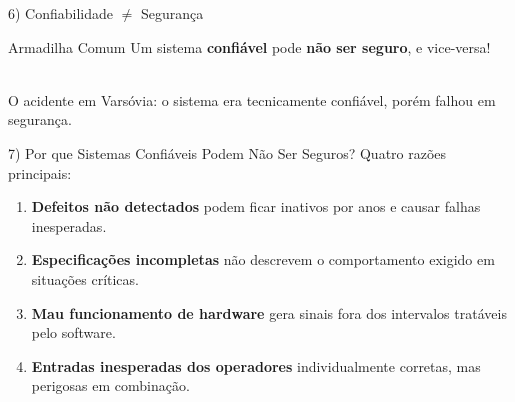 \documentclass[aspectratio=169]{beamer}
\begin{document}
\begin{frame}{6) Confiabilidade $\neq$ Segurança}
  \begin{alertblock}{Armadilha Comum}
    Um sistema \textbf{confiável} pode \textbf{não ser seguro}, e vice-versa!
  \end{alertblock}

  \vspace{0.5em}
  \centering
  \vspace{0.3em}\\
  \small{O acidente em Varsóvia: o sistema era tecnicamente confiável, porém falhou em segurança.}
\end{frame}

\begin{frame}{7) Por que Sistemas Confiáveis Podem Não Ser Seguros?}
  Quatro razões principais:
  \begin{enumerate}
    \item \textbf{Defeitos não detectados} podem ficar inativos por anos e causar falhas inesperadas.
    \item \textbf{Especificações incompletas} não descrevem o comportamento exigido em situações críticas.
    \item \textbf{Mau funcionamento de hardware} gera sinais fora dos intervalos tratáveis pelo software.
    \item \textbf{Entradas inesperadas dos operadores} individualmente corretas, mas perigosas em combinação.
  \end{enumerate}
\end{frame}
\end{document}
